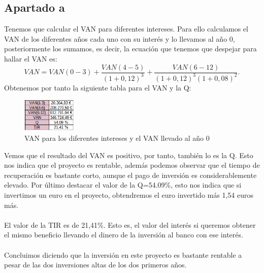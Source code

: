 \documentclass[11pt,letterpaper,onecolumn]{article}
\begin{document}
\subsection{Apartado a}
Tenemos que calcular el VAN para diferentes intereses. Para ello calculamos el VAN de los diferentes años cada uno con su interés y lo llevamos al año 0, posteriormente los sumamos, es decir, la ecuación que tenemos que despejar para hallar el VAN es:
\[
	VAN=VAN(0-3)+\frac{VAN(4-5)}{(1+0,12)^3}+ \frac{VAN(6-12)}{(1+0,12)^3(1+0,08)^2}
.\] 
Obtenemos por tanto la siguiente tabla para el VAN y la Q:
\begin{figure}[H]
	\centering
	\includegraphics[width=0.23\textwidth]{imagen/ej3a_van.PNG}
	\caption{VAN para los diferentes intereses y el VAN llevado al año 0}
	\label{fig:imagen-ej3a_van-PNG}
\end{figure}
Vemos que el resultado del VAN es positivo, por tanto, también lo es la Q. Esto nos indica que el proyecto es rentable, además podemos observar que el tiempo de recuperación es bastante corto, aunque el pago de inversión es considerablemente elevado. Por último destacar el valor de la Q=54.09\%, esto nos indica que si invertimos un euro en el proyecto, obtendremos el euro invertido más 1,54 euros más. \\
\\
El valor de la TIR es de 21,41\%. Esto es, el valor del interés si queremos obtener el mismo beneficio llevando el dinero de la inversión al banco con ese interés.\\ 
\\
Concluimos diciendo que la inversión en este proyecto es bastante rentable a pesar de las dos inversiones altas de los dos primeros años.
\end{document}
